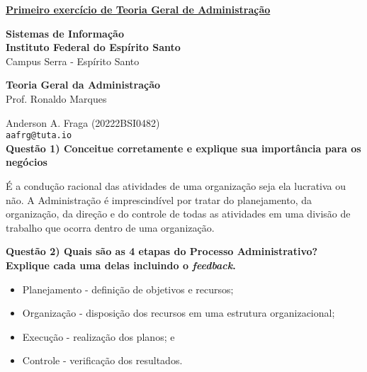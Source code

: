 \documentclass{article}
\begin{document}
\underline{\textbf{Primeiro exercício de Teoria Geral de Administração}}\par
\textbf{Sistemas de Informação}\\
\textbf{Instituto Federal do Espírito Santo}\\
Campus Serra - Espírito Santo\par
\textbf{Teoria Geral da Administração}\\
Prof. Ronaldo Marques\par
Anderson A. Fraga (20222BSI0482)\\
\texttt{aafrg@tuta.io}\\  %


\noindent \textbf{Questão 1) Conceitue corretamente e explique sua importância para os negócios}\par
É a condução racional das atividades de uma organização seja ela lucrativa ou não. A Administração é imprescindível por tratar do planejamento, da organização, da direção e do controle de todas as atividades em uma divisão de trabalho que ocorra dentro de uma organização.

\noindent \textbf{Questão 2) Quais são as 4 etapas do Processo Administrativo? Explique cada uma delas incluindo o \emph{feedback}.}\par
\begin{itemize}
    \item Planejamento - definição de objetivos e recursos;
    \item Organização - disposição dos recursos em uma estrutura organizacional;
    \item Execução - realização dos planos; e
    \item Controle - verificação dos resultados.
\end{itemize}
\end{document}
